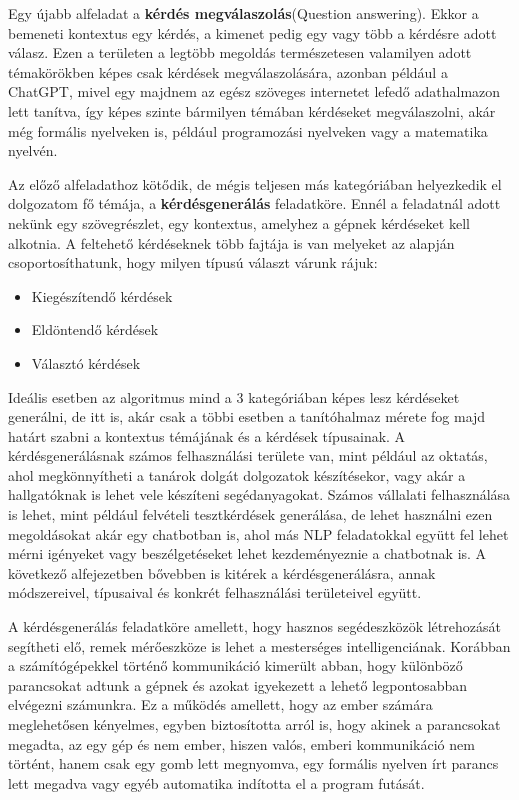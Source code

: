 	Egy újabb alfeladat a \textbf{kérdés megválaszolás}(Question answering). Ekkor a bemeneti kontextus egy kérdés, a kimenet pedig egy vagy több a kérdésre adott válasz. Ezen a területen a legtöbb megoldás természetesen valamilyen adott témakörökben képes csak kérdések megválaszolására, azonban például a ChatGPT, mivel egy majdnem az egész szöveges internetet lefedő adathalmazon lett tanítva, így képes szinte bármilyen témában kérdéseket megválaszolni, akár még formális nyelveken is, például programozási nyelveken vagy a matematika nyelvén.
	
	Az előző alfeladathoz kötődik, de mégis teljesen más kategóriában helyezkedik el dolgozatom fő témája, a \textbf{kérdésgenerálás} feladatköre. Ennél a feladatnál adott nekünk egy szövegrészlet, egy kontextus, amelyhez a gépnek kérdéseket kell alkotnia. A feltehető kérdéseknek több fajtája is van melyeket az alapján csoportosíthatunk, hogy milyen típusú választ várunk rájuk\cite{questions}:

\begin{itemize}
\item Kiegészítendő kérdések
\item Eldöntendő kérdések
\item Választó kérdések
\end{itemize}

Ideális esetben az algoritmus mind a 3 kategóriában képes lesz kérdéseket generálni, de itt is, akár csak a többi esetben a tanítóhalmaz mérete fog majd határt szabni a kontextus témájának és a kérdések típusainak. A kérdésgenerálásnak számos felhasználási területe van, mint például az oktatás, ahol megkönnyítheti a tanárok dolgát dolgozatok készítésekor, vagy akár a hallgatóknak is lehet vele készíteni segédanyagokat. Számos vállalati felhasználása is lehet, mint például felvételi tesztkérdések generálása, de lehet használni ezen megoldásokat akár egy chatbotban is, ahol más NLP feladatokkal együtt fel lehet mérni igényeket vagy beszélgetéseket lehet kezdeményeznie a chatbotnak is. A következő alfejezetben bővebben is kitérek a kérdésgenerálásra, annak módszereivel, típusaival és konkrét felhasználási területeivel együtt.
 

A kérdésgenerálás feladatköre amellett, hogy hasznos segédeszközök létrehozását segítheti elő, remek mérőeszköze is lehet a mesterséges intelligenciának. Korábban a számítógépekkel történő kommunikáció kimerült abban, hogy különböző parancsokat adtunk a gépnek és azokat igyekezett a lehető legpontosabban elvégezni számunkra. Ez a működés amellett, hogy az ember számára meglehetősen kényelmes, egyben biztosította arról is, hogy akinek a parancsokat megadta, az egy gép és nem ember, hiszen valós, emberi kommunikáció nem történt, hanem csak egy gomb lett megnyomva, egy formális nyelven írt parancs lett megadva vagy egyéb automatika indította el a program futását.

